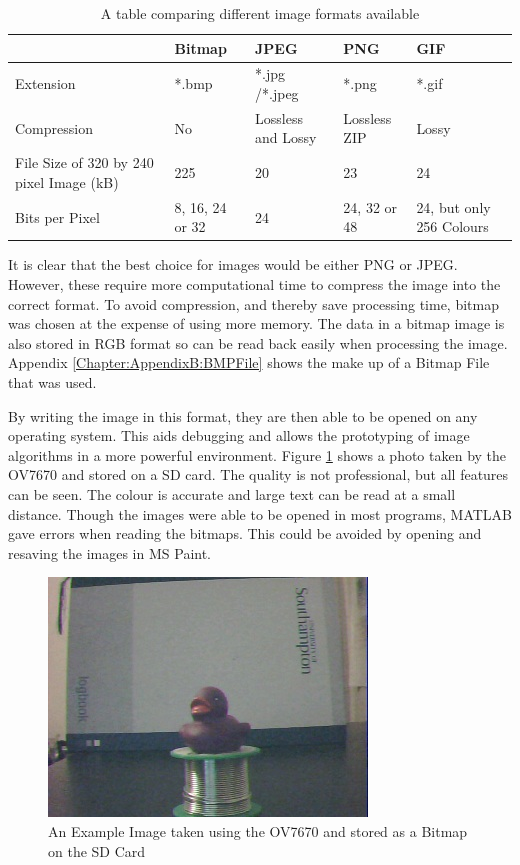 \begin{table}
\centering
\begin{tabular}{|p{3cm}| p{2cm}|p{2cm}|p{2cm}|p{2cm}|} \hline
			&	Bitmap 		& 	JPEG			 	&	PNG				& 	GIF \\ \hline
Extension 		& 	*.bmp 		&  	*.jpg /*.jpeg 		& 	*.png				& 	*.gif \\ \hline
Compression 	& 	No 			& 	Lossless  and Lossy		&	Lossless ZIP			&	Lossy	\\\hline
File Size of 320 by 
240 pixel Image (kB) &	225			&	20				&	23				&	24 \\\hline
Bits per Pixel		&	8, 16, 24 or 32	&	24				&	24, 32 or 48 			& 	24, but only 256 Colours \\


\hline
\end{tabular}
\caption{A table comparing different image formats available \citep{ImageComparison}}
\label{ImageFormats}
\end{table}

It is clear that the best choice for images would be either PNG or JPEG. However, these require more computational time to compress the image into the correct format. To avoid compression, and thereby save processing time, bitmap was chosen at the expense of using more memory. The data in a bitmap image is also stored in RGB format so can be read back easily when processing the image. Appendix \ref{Chapter:AppendixB:BMPFile} shows the make up of a Bitmap File that was used.

By writing the image in this format, they are then able to be opened on any operating system. This aids debugging and allows the prototyping of image algorithms in a more powerful environment. Figure \ref{ExampleImage} shows a photo taken by the OV7670 and stored on a SD card. The quality is not professional, but all features can be seen. The colour is accurate and large text can be read at a small distance. Though the images were able to be opened in most programs, MATLAB gave errors when reading the bitmaps. This could be avoided by opening and resaving the images in MS Paint.

\begin{figure}
\begin{center}
\includegraphics{Figures/ExampleImageFromCamera.jpg} 
\end{center}
\caption{An Example Image taken using the OV7670 and stored as a Bitmap on the SD Card}
\label{ExampleImage}
\end{figure}

